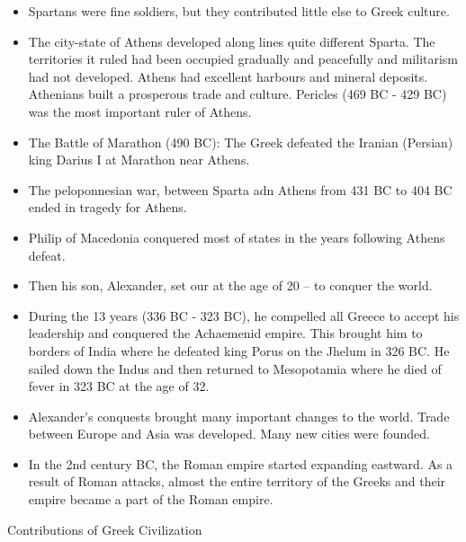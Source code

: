 \documentclass[
  openany]{book}
\begin{document}
\begin{itemize}
\item
  Spartans were fine soldiers, but they contributed little else to Greek culture.
\item
  The city-state of Athens developed along lines quite different Sparta. The territories it ruled had been occupied gradually and peacefully and militarism had not developed. Athens had excellent harbours and mineral deposits. Athenians built a prosperous trade and culture. Pericles (469 BC - 429 BC) was the most important ruler of Athens.
\item
  The Battle of Marathon (490 BC): The Greek defeated the Iranian (Persian) king Darius I at Marathon near Athens.
\item
  The peloponnesian war, between Sparta adn Athens from 431 BC to 404 BC ended in tragedy for Athens.
\item
  Philip of Macedonia conquered most of states in the years following Athens defeat.
\item
  Then his son, Alexander, set our at the age of 20 -- to conquer the world.
\item
  During the 13 years (336 BC - 323 BC), he compelled all Greece to accept his leadership and conquered the Achaemenid empire. This brought him to borders of India where he defeated king Porus on the Jhelum in 326 BC. He sailed down the Indus and then returned to Mesopotamia where he died of fever in 323 BC at the age of 32.
\item
  Alexander's conquests brought many important changes to the world. Trade between Europe and Asia was developed. Many new cities were founded.
\item
  In the 2nd century BC, the Roman empire started expanding eastward. As a result of Roman attacks, almost the entire territory of the Greeks and their empire became a part of the Roman empire.
\end{itemize}

Contributions of Greek Civilization
\end{document}
